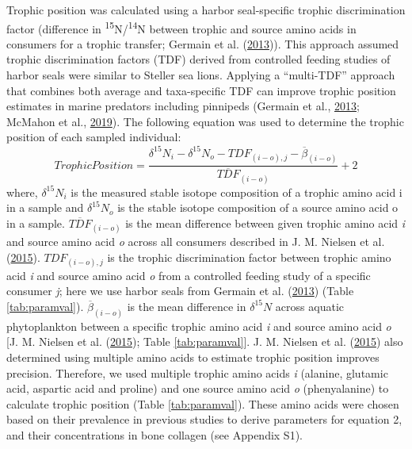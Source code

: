 \documentclass [11pt, proquest] {uwthesis}[2015/03/03]
\begin{document}
Trophic position was calculated using a harbor seal-specific trophic
discrimination factor (difference in
\textsuperscript{15}N/\textsuperscript{14}N between trophic and source
amino acids in consumers for a trophic transfer; Germain et al.
(\protect\hyperlink{ref-Germain2013}{2013})). This approach assumed
trophic discrimination factors (TDF) derived from controlled feeding
studies of harbor seals were similar to Steller sea lions. Applying a
``multi-TDF'' approach that combines both average and taxa-specific TDF
can improve trophic position estimates in marine predators including
pinnipeds (Germain et al., \protect\hyperlink{ref-Germain2013}{2013};
McMahon et al., \protect\hyperlink{ref-McMahon2019}{2019}). The
following equation was used to determine the trophic position of each
sampled individual:
\begin{equation} 
Trophic Position =   
  \frac{\delta^{15}N_i - \delta^{15}N_o - TDF_{(i-o),j} - \overline{\beta}_{(i-o)}}{\overline{TDF}_{(i-o)}}+2
  \label{eq:TP}
\end{equation}
where, \(\delta^{15}N_i\) is the measured stable isotope composition of
a trophic amino acid i in a sample and \(\delta^{15}N_o\) is the stable
isotope composition of a source amino acid o in a sample.
\(\overline{TDF}_{(i-o)}\) is the mean difference between given trophic
amino acid \emph{i} and source amino acid \emph{o} across all consumers
described in J. M. Nielsen et al.
(\protect\hyperlink{ref-Nielsen2015}{2015}). \(TDF_{(i-o), j}\) is the
trophic discrimination factor between trophic amino acid \emph{i} and
source amino acid \emph{o} from a controlled feeding study of a specific
consumer \emph{j}; here we use harbor seals from Germain et al.
(\protect\hyperlink{ref-Germain2013}{2013}) (Table \ref{tab:paramval}).
\(\overline\beta_{(i-o)}\) is the mean difference in \(\delta^{15}N\)
across aquatic phytoplankton between a specific trophic amino acid
\emph{i} and source amino acid \emph{o} {[}J. M. Nielsen et al.
(\protect\hyperlink{ref-Nielsen2015}{2015}); Table
\ref{tab:paramval}{]}. J. M. Nielsen et al.
(\protect\hyperlink{ref-Nielsen2015}{2015}) also determined using
multiple amino acids to estimate trophic position improves precision.
Therefore, we used multiple trophic amino acids \emph{i} (alanine,
glutamic acid, aspartic acid and proline) and one source amino acid
\emph{o} (phenyalanine) to calculate trophic position (Table
\ref{tab:paramval}). These amino acids were chosen based on their
prevalence in previous studies to derive parameters for equation 2, and
their concentrations in bone collagen (see Appendix S1).
\end{document}
